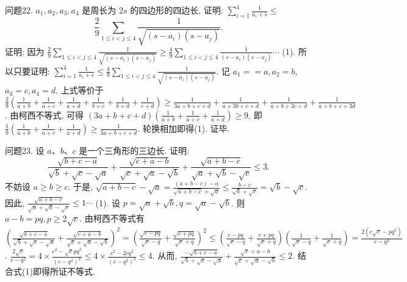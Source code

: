 问题22. $a_1, a_2, a_3, a_4$ 是周长为 $2 s$ 的四边形的四边长, 证明: $\sum_{i=1}^4 \frac{1}{a_i+s} \leqslant$
$$
\frac{2}{9} \sum_{1 \leqslant i<j \leqslant 4} \frac{1}{\sqrt{\left(s-a_i\right)\left(s-a_j\right)}} .
$$
证明: 因为 $\frac{2}{9} \sum_{1 \leqslant i<j \leqslant 4} \frac{1}{\sqrt{\left(s-a_i\right)\left(s-a_j\right)}} \geqslant \frac{4}{9} \sum_{1 \leqslant i<j \leqslant 4} \frac{1}{\left(s-a_i\right)\left(s-a_j\right)} \cdots$ (1). 所以只要证明: $\sum_{i=1}^4 \frac{1}{a_i+s} \leqslant \frac{4}{9} \sum_{1 \leqslant i<j \leqslant 4} \frac{1}{\sqrt{\left(s-a_i\right)\left(s-a_j\right)}}$. 记 $a_1==a, a_2=b$, $a_3=c, a_4=d$. 上式等价于 $\frac{2}{9}\left(\frac{1}{a+b}+\frac{1}{a+c}+\frac{1}{a+d}+\frac{1}{b+c}+\frac{1}{b+d}+\frac{1}{c+d}\right) \geqslant \frac{1}{3 a+b+c+d}+\frac{1}{a+3 b+c+d}+\frac{1}{a+b+3 c+d}+\frac{1}{a+b+c+3 d}$. 由柯西不等式, 可得 $(3 a+b+c+d)\left(\frac{1}{a+b}+\frac{1}{a+c}+\frac{1}{a+d}\right) \geqslant 9$, 即 $\frac{1}{9}\left(\frac{1}{a+b}+\frac{1}{a+c}+\frac{1}{a+d}\right) \geqslant \frac{1}{3 a+b+c+d}$. 轮换相加即得(1). 证毕.



问题23. 设 $a 、 b 、 c$ 是一个三角形的三边长.
证明:
$$
\frac{\sqrt{b+c-a}}{\sqrt{b}+\sqrt{c}-\sqrt{a}}+\frac{\sqrt{c+a-b}}{\sqrt{c}+\sqrt{a}-\sqrt{b}}+\frac{\sqrt{a+b-c}}{\sqrt{a}+\sqrt{b}-\sqrt{c}} \leqslant 3 .
$$
不妨设 $a \geqslant b \geqslant c$. 于是, $\sqrt{a+b-c}-\sqrt{a}=\frac{(a+b-c)-a}{\sqrt{a+b-c}+\sqrt{a}} \leqslant \frac{b-c}{\sqrt{b}+\sqrt{c}}=\sqrt{b}-\sqrt{c}$. 因此, $\frac{\sqrt{a+b-c}}{\sqrt{a}+\sqrt{b}-\sqrt{c}} \leqslant 1 \cdots$ (1). 设 $p=\sqrt{a}+\sqrt{b}, q=\sqrt{a}-\sqrt{b}$. 则 $a-b=p q, p \geqslant 2 \sqrt{c}$. 由柯西不等式有 $\left(\frac{\sqrt{b+c-a}}{\sqrt{b}+\sqrt{c}-\sqrt{a}}+\frac{\sqrt{c+a-b}}{\sqrt{c}+\sqrt{a}-\sqrt{b}}\right)^2= \left(\frac{\sqrt{c-p q}}{\sqrt{c}-q}+\frac{\sqrt{c+p q}}{\sqrt{c}+q}\right)^2 \leqslant\left(\frac{c-p q}{\sqrt{c}-q}+\frac{c+p q}{\sqrt{c}+q}\right)\left(\frac{1}{\sqrt{c}-q}+\frac{1}{\sqrt{c}+q}\right)=\frac{2\left(c \sqrt{c}-p q^2\right)}{c-q^2}$. $\frac{2 \sqrt{c}}{c-q^2}=4 \times \frac{c^2-\sqrt{c} p q^2}{\left(c-q^2\right)^2} \leqslant 4 \times \frac{c^2-2 c q^2}{\left(c-q^2\right)^2} \leqslant 4$. 从而, $\frac{-\sqrt{b+c-a}}{\sqrt{b}+\sqrt{c}-\sqrt{a}}+\frac{\sqrt{c}+a-b}{\sqrt{c}+\sqrt{a}-\sqrt{b}} \leqslant 2$. 结合式(1)即得所证不等式.


